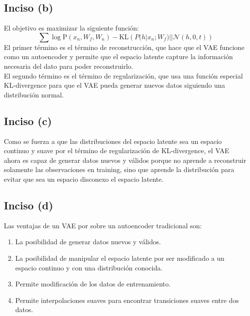 \documentclass[12pt, a4paper]{article}
\begin{document}
        \subsection*{Inciso (b)}
            \noindent El objetivo es maximizar la siguiente función: \[ \sum \log \text{P}\left(x_{n}, W_{f}, W_{n}\right) - \text{KL}\left(P(h | x_{n}; W_{f}) || \mathcal{N}(h, 0, t)\right) \]
            \noindent El primer término es el término de reconstrucción, que hace que el VAE funcione como un autoencoder y permite que el espacio latente capture la información necesaria del dato para poder reconstruirlo. \\
            El segundo término es el término de regularización, que usa una función especial KL-divergence para que el VAE pueda generar nuevos datos siguiendo una distribución normal.
        \subsection*{Inciso (c)}
            \noindent Como se fuerza a que las distribuciones del espacio latente sea un espacio continuo y suave por el término de regularización de KL-divergence, el VAE ahora es capaz de generar datos nuevos y válidos porque no aprende a reconstruir solamente las observaciones en training, sino que aprende la distribución para evitar que sea un espacio disconexo el espacio latente.
        \subsection*{Inciso (d)}
            \noindent Las ventajas de un VAE por sobre un autoencoder tradicional son:
            \begin{enumerate}
                \item La posibilidad de generar datos nuevos y válidos.
                \item La posibilidad de manipular el espacio latente por ser modificado a un espacio continuo y con una distribución conocida.
                \item Permite modificación de los datos de entrenamiento.
                \item Permite interpolaciones suaves para encontrar transiciones suaves entre dos datos.
            \end{enumerate}
\end{document}
